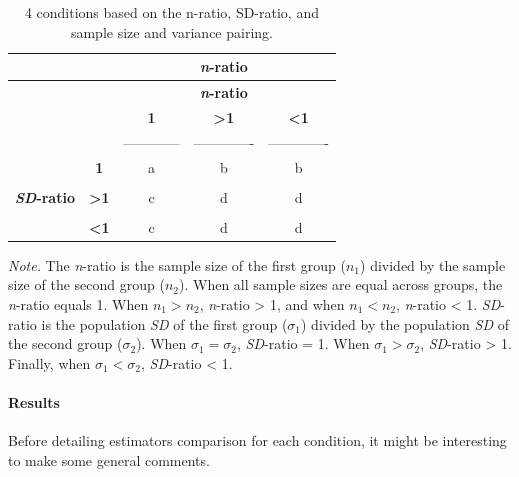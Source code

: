 \documentclass[
  man,floatsintext]{apa6}
\begin{document}
\begin{longtable}[]{@{}ccccc@{}}
\caption{4 conditions based on the n-ratio, SD-ratio, and sample size and variance pairing.}\tabularnewline
\toprule
& & & \textbf{\emph{n}-ratio} &\tabularnewline
\midrule
\endfirsthead
\toprule
& & & \textbf{\emph{n}-ratio} &\tabularnewline
\midrule
\endhead
& & \textbf{1} & \textbf{\textgreater1} & \textbf{\textless1}\tabularnewline
& & ------------ & ------------- & -------------\tabularnewline
& \textbf{1} & a & b & b\tabularnewline
& & & &\tabularnewline
\textbf{\emph{SD}-ratio} & \textbf{\textgreater1} & c & d & d\tabularnewline
& & & &\tabularnewline
& \textbf{\textless1} & c & d & d\tabularnewline
\bottomrule
\end{longtable}

\emph{Note.} The \emph{n}-ratio is the sample size of the first group (\(n_1\)) divided by the sample size of the second group (\(n_2\)). When all sample sizes are equal across groups, the \emph{n}-ratio equals 1. When \(n_1 > n_2\), \emph{n}-ratio \textgreater{} 1, and when \(n_1 < n_2\), \emph{n}-ratio \textless{} 1. \emph{SD}-ratio is the population \emph{SD} of the first group (\(\sigma_1\)) divided by the population \emph{SD} of the second group (\(\sigma_2\)). When \(\sigma_1=\sigma_2\), \emph{SD}-ratio = 1. When \(\sigma_1>\sigma_2\), \emph{SD}-ratio \textgreater{} 1. Finally, when \(\sigma_1<\sigma_2\), \emph{SD}-ratio \textless{} 1.

\hypertarget{results}{%
\paragraph{Results}\label{results}}

Before detailing estimators comparison for each condition, it might be interesting to make some general comments.
\end{document}
